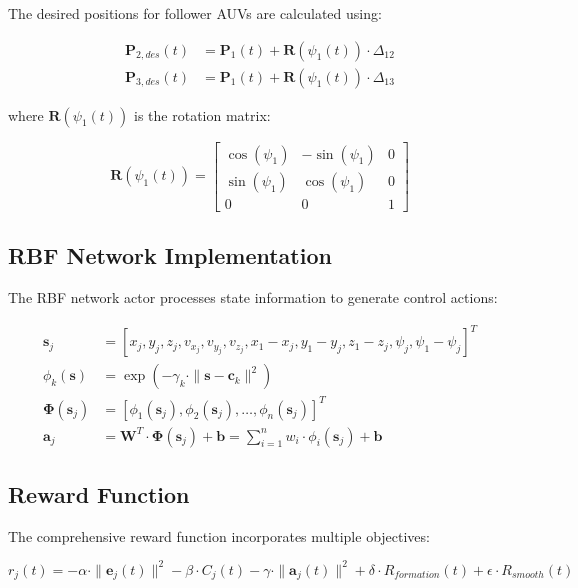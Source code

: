 \documentclass[11pt,a4paper]{article}
\newcommand{\vect}[1]{\boldsymbol{#1}}
\begin{document}
The desired positions for follower AUVs are calculated using:

\begin{align}
\vect{P}_{2,des}(t) &= \vect{P}_1(t) + \vect{R}(\psi_1(t)) \cdot \Delta_{12}\\
\vect{P}_{3,des}(t) &= \vect{P}_1(t) + \vect{R}(\psi_1(t)) \cdot \Delta_{13}
\end{align}

where $\vect{R}(\psi_1(t))$ is the rotation matrix:

\begin{equation}
\vect{R}(\psi_1(t)) = \begin{bmatrix}
\cos(\psi_1) & -\sin(\psi_1) & 0 \\
\sin(\psi_1) & \cos(\psi_1) & 0 \\
0 & 0 & 1
\end{bmatrix}
\end{equation}

\subsection{RBF Network Implementation}

The RBF network actor processes state information to generate control actions:

\begin{align}
\vect{s}_j &= [x_j, y_j, z_j, v_{x_j}, v_{y_j}, v_{z_j}, x_1-x_j, y_1-y_j, z_1-z_j, \psi_j, \psi_1-\psi_j]^T\\
\phi_k(\vect{s}) &= \exp(-\gamma_k \cdot \|\vect{s} - \vect{c}_k\|^2)\\
\vect{\Phi}(\vect{s}_j) &= [\phi_1(\vect{s}_j), \phi_2(\vect{s}_j), \ldots, \phi_n(\vect{s}_j)]^T\\
\vect{a}_j &= \vect{W}^T \cdot \vect{\Phi}(\vect{s}_j) + \vect{b} = \sum_{i=1}^{n} w_i \cdot \phi_i(\vect{s}_j) + \vect{b}
\end{align}

\subsection{Reward Function}

The comprehensive reward function incorporates multiple objectives:

\begin{equation}
r_j(t) = -\alpha \cdot \|\vect{e}_j(t)\|^2 - \beta \cdot C_j(t) - \gamma \cdot \|\vect{a}_j(t)\|^2 + \delta \cdot R_{formation}(t) + \epsilon \cdot R_{smooth}(t)
\label{eq:reward}
\end{equation}
\end{document}
